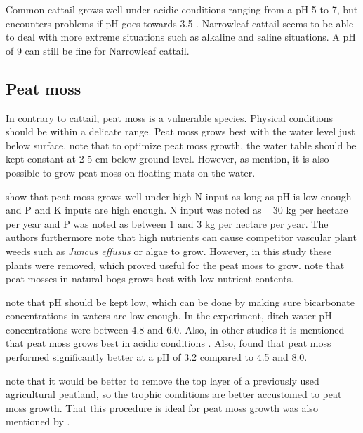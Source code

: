 \documentclass[a4paper,12pt]{scrbook}
\begin{document}
Common cattail grows well under acidic conditions ranging from a pH 5 to 7, but encounters problems if pH goes towards 3.5 \citep{brix2002typha}. Narrowleaf cattail seems to be able to deal with more extreme situations such as alkaline and saline situations. A pH of 9 can still be fine for Narrowleaf cattail.



\subsection{Peat moss}

In contrary to cattail, peat moss is a vulnerable species. Physical conditions should be within a delicate range. Peat moss grows best with the water level just below surface.  \citet{fritz2014paludicultuur} note that to optimize peat moss growth, the water table should be kept constant at 2-5 cm below ground level. However, as \citet{gaudig2014sphagnum} mention, it is also possible to grow peat moss on floating mats on the water.

\citet{Temmink2017196} show that peat moss grows well under high N input as long as pH is low enough and P and K inputs are high enough. 
N input was noted as ~ 30 kg per hectare per year and P was noted as between 1 and 3 kg per hectare per year.  The authors furthermore note that high nutrients can cause competitor vascular plant weeds such as \textit{Juncus effusus} or algae to grow. However, in this study these plants were removed, which proved useful for the peat moss to grow. \citep{wichtmann2016paludiculture} note that peat mosses in natural bogs grows best with low nutrient contents.


\citet{Temmink2017196} note that pH should be kept low, which can be done by making sure bicarbonate concentrations in waters are low enough. In the experiment, ditch water pH concentrations were between 4.8 and 6.0. Also, in other studies it is mentioned that peat moss grows best in acidic conditions \citep{wichtmann2016paludiculture}. Also, \citet{gaudig2005growing} found that peat moss performed significantly better at a pH of 3.2 compared to 4.5 and 8.0. 

\citet{fritz2014paludicultuur} note that it would be better to remove the top layer of a previously used agricultural peatland, so the trophic conditions are better accustomed to peat moss growth. That this procedure is ideal for peat moss growth was also mentioned by \citet{Temmink2017196}.
\end{document}
